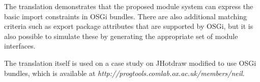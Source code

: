 The translation demonstrates that the proposed module system can express the basic import
constraints in OSGi bundles. There are also additional matching criteria such as
export package attributes that are supported by OSGi, but it is also possible to simulate
these by generating the appropriate set of module interfaces.

The translation itself is used on a case study on JHotdraw modified to use OSGi bundles,
which is available at \textit{http://progtools.comlab.ox.ac.uk/members/neil}.